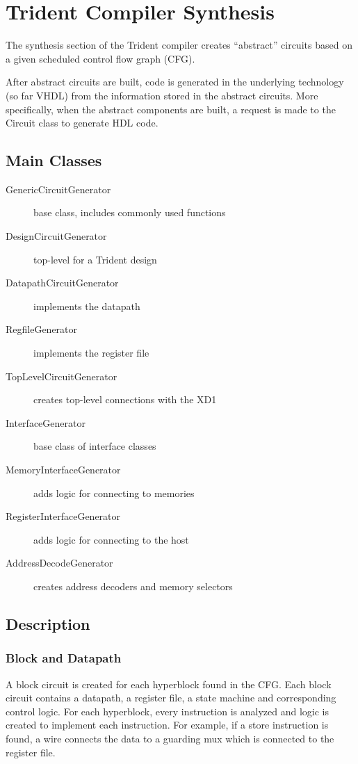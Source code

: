 \section{Trident Compiler Synthesis}


The synthesis section of the Trident compiler creates ``abstract''
circuits based on a given scheduled control flow graph (CFG).

After abstract circuits are built, code is generated in the underlying
technology (so far VHDL) from the information stored in the abstract
circuits.  More specifically, when the abstract components are built,
a request is made to the Circuit class to generate HDL code.

\subsection{Main Classes}

\begin{description}
\item[GenericCircuitGenerator] base class, includes commonly used functions
\item[DesignCircuitGenerator] top-level for a Trident design
\item[DatapathCircuitGenerator] implements the datapath 
\item[RegfileGenerator] implements the register file
\item[TopLevelCircuitGenerator] creates top-level connections with the XD1
\item[InterfaceGenerator] base class of interface classes
\item[MemoryInterfaceGenerator] adds logic for connecting to memories
\item[RegisterInterfaceGenerator] adds logic for connecting to the host
\item[AddressDecodeGenerator] creates address decoders and memory selectors
\end{description}

\subsection{Description}

\subsubsection{Block and Datapath}

A block circuit is created for each hyperblock found in the CFG.  Each
block circuit contains a datapath, a register file, a state machine
and corresponding control logic. For each hyperblock, every
instruction is analyzed and logic is created to implement each
instruction. For example, if a store instruction is found, a wire
connects the data to a guarding mux which is connected to the register
file.

